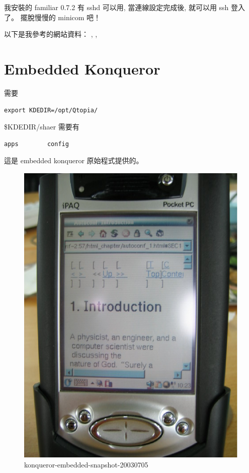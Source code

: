 \documentclass[12pt,a4paper]{article}
\begin{document}
\begin{CJK}{UTF8}{bsmi}
我安裝的 familiar 0.7.2 有 sshd 可以用,
當連線設定完成後, 就可以用 ssh 登入了。
擺脫慢慢的 minicom 吧！

以下是我參考的網站資料：
\cite{ethernet_usb}, \cite{ZAURUS}, \cite{usb_driver}


\section{Embedded Konqueror}
需要 
\begin{verbatim}
export KDEDIR=/opt/Qtopia/
\end{verbatim}

\$KDEDIR/shaer 需要有
\begin{verbatim}
apps        config 
\end{verbatim}
這是 embedded konqueror 原始程式提供的。


\begin{figure}[htbp]
\centering
\includegraphics[scale=0.3]{eps/konqueror.eps}
\caption{konqueror-embedded-snapshot-20030705}
\end{figure}


\end{CJK}
\end{document}
